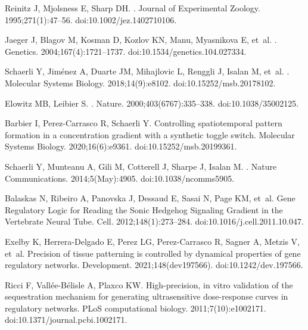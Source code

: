 \documentclass[10pt,letterpaper]{article}
\begin{document}
\begin{thebibliography}{10}
Reinitz J, Mjolsness E, Sharp DH.
.
\newblock Journal of Experimental Zoology. 1995;271(1):47--56.
\newblock doi:{10.1002/jez.1402710106}.

Jaeger J, Blagov M, Kosman D, Kozlov KN, Manu, Myasnikova E, et~al.
.
\newblock Genetics. 2004;167(4):1721--1737.
\newblock doi:{10.1534/genetics.104.027334}.

Schaerli Y, Jim{\'{e}}nez A, Duarte JM, Mihajlovic L, Renggli J, Isalan M,
  et~al.
.
\newblock Molecular Systems Biology. 2018;14(9):e8102.
\newblock doi:{10.15252/msb.20178102}.

Elowitz MB, Leibier S.
.
\newblock Nature. 2000;403(6767):335--338.
\newblock doi:{10.1038/35002125}.

Barbier I, Perez-Carrasco R, Schaerli Y.
\newblock Controlling spatiotemporal pattern formation in a concentration
  gradient with a synthetic toggle switch.
\newblock Molecular Systems Biology. 2020;16(6):e9361.
\newblock doi:{10.15252/msb.20199361}.

Schaerli Y, Munteanu A, Gili M, Cotterell J, Sharpe J, Isalan M.
.
\newblock Nature Communications. 2014;5(May):4905.
\newblock doi:{10.1038/ncomms5905}.

Balaskas N, Ribeiro A, Panovska J, Dessaud E, Sasai N, Page KM, et~al.
\newblock Gene {Regulatory} {Logic} for {Reading} the {Sonic} {Hedgehog}
  {Signaling} {Gradient} in the {Vertebrate} {Neural} {Tube}.
\newblock Cell. 2012;148(1):273--284.
\newblock doi:{10.1016/j.cell.2011.10.047}.

Exelby K, Herrera-Delgado E, Perez LG, Perez-Carrasco R, Sagner A, Metzis V,
  et~al.
\newblock Precision of tissue patterning is controlled by dynamical properties
  of gene regulatory networks.
\newblock Development. 2021;148(dev197566).
\newblock doi:{10.1242/dev.197566}.

Ricci F, Vallée-Bélisle A, Plaxco KW.
\newblock High-precision, in vitro validation of the sequestration mechanism
  for generating ultrasensitive dose-response curves in regulatory networks.
\newblock PLoS computational biology. 2011;7(10):e1002171.
\newblock doi:{10.1371/journal.pcbi.1002171}.


\end{thebibliography}
\end{document}
